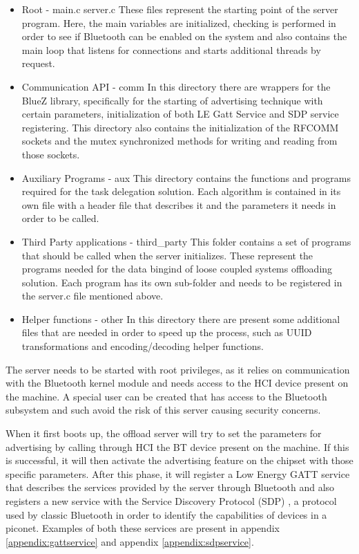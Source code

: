 \begin{itemize}

\item{Root - main.c server.c}
	These files represent the starting point of the server program. Here, the main variables are initialized, checking is performed in order to see if Bluetooth can be enabled on the system and also contains the main loop that listens for connections and starts additional threads by request.

\item{Communication API - comm}
	In this directory there are wrappers for the BlueZ library, specifically for the starting of advertising technique with certain parameters, initialization of both LE Gatt Service and SDP service registering. This directory also contains the initialization of the RFCOMM sockets and the mutex synchronized methods for writing and reading from those sockets.

\item{Auxiliary Programs - aux}
	This directory contains the functions and programs required for the task delegation solution. Each algorithm is contained in its own file with a header file that describes it and the parameters it needs in order to be called.
	
\item{Third Party applications - third_party}
	This folder contains a set of programs that should be called when the server initializes. These represent the programs needed for the data bingind of loose coupled systems offloading solution. Each program has its own sub-folder and needs to be registered in the server.c file mentioned above.
	
\item{Helper functions - other}
	In this directory there are present some additional files that are needed in order to speed up the process, such as UUID transformations and encoding/decoding helper functions.

\end{itemize}


The server needs to be started with root privileges, as it relies on communication with the Bluetooth kernel module and needs access to the HCI device present on the machine. A special user can be created that has access to the Bluetooth subsystem and such avoid the risk of this server causing security concerns.

When it first boots up, the offload server will try to set the parameters for advertising by calling through HCI the BT device present on the machine. If this is successful, it will then activate the advertising feature on the chipset with those specific parameters. After this phase, it will register a Low Energy GATT service that describes the services provided by the server through Bluetooth and also registers a new service with the Service Discovery Protocol (SDP) , a protocol used by classic Bluetooth in order to identify the capabilities of devices in a piconet. Examples of both these services are present in appendix \ref{appendix:gattservice} and appendix \ref{appendix:sdpservice}.

